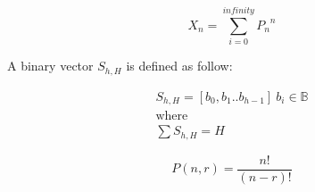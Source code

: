 \begin{equation}
X_n = \sum_{i=0}^{infinity} {P_n}^n
\end{equation}

A binary vector $S_{h,H}$ is defined as follow:

\begin{align}
S_{h,H} = [b_{0}, b_{1} .. b_{h-1}] ~ b_{i} \in \mathbb{B}\\
\text{where}\\
\sum S_{h,H} = H
\end{align}




\begin{equation}
P(n,r) = \frac{n!}{(n-r)!}
\end{equation}
